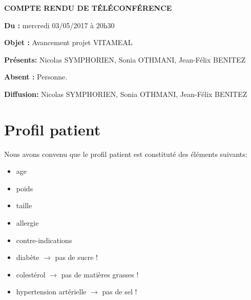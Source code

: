 \documentclass[11pt,a4paper,french,twoside,openright]{article}
\begin{document}
\pagestyle{fancy}

\begin{center}\bfseries\Huge
COMPTE RENDU DE TÉLÉCONFÉRENCE
\end{center}

\textbf{Du      :} mercredi 03/05/2017 à 20h30

\textbf{Objet   :} Avancement projet VITAMEAL

\textbf{Présents:} Nicolas SYMPHORIEN, Sonia OTHMANI, Jean-Félix BENITEZ

\textbf{Absent :} Personne.

\textbf{Diffusion:} Nicolas SYMPHORIEN, Sonia OTHMANI, Jean-Félix BENITEZ

\hrulefill

\section{Profil patient}
Nous avons convenu que le profil patient est constituté des éléments suivants:
\begin{itemize}
\item age
\item poids
\item taille
\item allergie
\item contre-indications
\item diabète $\rightarrow$ pas de sucre !
\item colestérol $\rightarrow$ pas de matières grasses !
\item hypertension artérielle $\rightarrow$ pas de sel !
\end{itemize}
\end{document}
